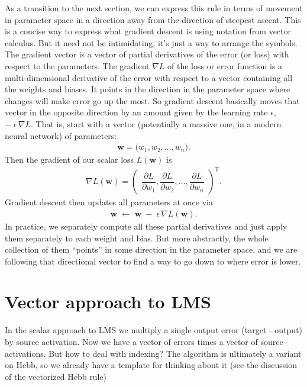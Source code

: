 As a transition to the next section, we can express this rule in terms of movement in parameter space in a direction away from the direction of steepest ascent.  This is a concise way to express what gradient descent is using notation from vector calculus. But it need not be intimidating, it's just a way to arrange the symbols. The gradient vector is a vector of partial derivatives of the error (or loss) with respect to the parameters. The gradient $\nabla L$ of the loss or error function is a multi-dimensional derivative of the error with respect to a vector containing all the weights and biases. It points in the direction in the parameter space where changes will make error go up the most.  So gradient descent basically moves that vector in the opposite direction by an amount given by the learning rate $\epsilon$,  $-\;\epsilon\,\nabla L$. That is, start with a vector (potentially a massive one, in a modern neural network) of parameters:
\begin{eqnarray*}
  \mathbf{w} = \bigl(w_1, w_2, \dots, w_n\bigr).
\end{eqnarray*}
Then the gradient of our scalar loss \(L(\mathbf{w})\) is
\begin{eqnarray*}
  \nabla L(\mathbf{w})
    = \begin{pmatrix}
        \dfrac{\partial L}{\partial w_1}, 
        \dfrac{\partial L}{\partial w_2}, 
        \dots, 
        \dfrac{\partial L}{\partial w_n}
      \end{pmatrix}^\mathsf{T}.
\end{eqnarray*}
Gradient descent then updates all parameters at once via
\begin{eqnarray*}
  \mathbf{w} \;\leftarrow\; \mathbf{w} \;-\;\epsilon\,\nabla L(\mathbf{w}).
\end{eqnarray*}
In practice, we separately compute all these partial derivatives and just apply them separately to each weight and bias. But more abstractly, the whole collection of them ``points'' in some direction in the parameter space, and we are following that directional vector to find a way to go down to where error is lower.

\section{Vector approach to LMS}

In the scalar approach to LMS we multiply a single output error (target - output) by source activation. Now we have a vector of errors times a vector of source activations. But how to deal with indexing?  The algorithm is ultimately a variant on Hebb, so we already have a template for thinking about it (see the discussion of the vectorized Hebb rule)

